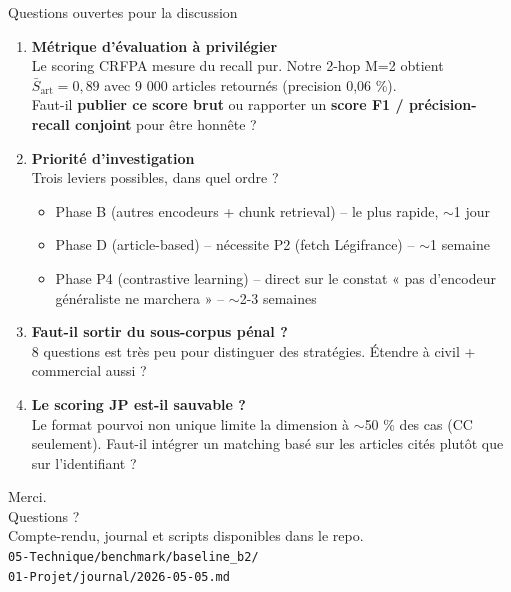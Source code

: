 \documentclass[aspectratio=169,10pt]{beamer}
\begin{document}
\begin{frame}{Questions ouvertes pour la discussion}
  \footnotesize
  \begin{enumerate}
    \item \textbf{Métrique d'évaluation à privilégier} \\
    \footnotesize Le scoring CRFPA mesure du recall pur. Notre 2-hop M=2 obtient \(\bar{S}_{\text{art}} = 0{,}89\) avec 9 000 articles retournés (precision 0,06 \%). \\
    Faut-il \textbf{publier ce score brut} ou rapporter un \textbf{score F1 / précision-recall conjoint} pour être honnête ?

    \vspace{0.4em}
    \item \textbf{Priorité d'investigation} \\
    \footnotesize Trois leviers possibles, dans quel ordre ?
    \begin{itemize}\scriptsize
      \item Phase B (autres encodeurs + chunk retrieval) -- le plus rapide, $\sim$1 jour
      \item Phase D (article-based) -- nécessite P2 (fetch Légifrance) -- $\sim$1 semaine
      \item Phase P4 (contrastive learning) -- direct sur le constat « pas d'encodeur généraliste ne marchera » -- $\sim$2-3 semaines
    \end{itemize}

    \vspace{0.4em}
    \item \textbf{Faut-il sortir du sous-corpus pénal ?} \\
    \footnotesize 8 questions est très peu pour distinguer des stratégies. Étendre à civil + commercial aussi ?

    \vspace{0.4em}
    \item \textbf{Le scoring JP est-il sauvable ?} \\
    \footnotesize Le format pourvoi non unique limite la dimension à $\sim$50 \% des cas (CC seulement). Faut-il intégrer un matching basé sur les articles cités plutôt que sur l'identifiant ?
  \end{enumerate}
\end{frame}

\begin{frame}
  \begin{center}
    \vspace{1em}
    {\Huge \textcolor{accent}{Merci.}}\\[1.5em]
    {\Large Questions ?}\\[2em]
    \footnotesize Compte-rendu, journal et scripts disponibles dans le repo. \\
    \texttt{05-Technique/benchmark/baseline\_b2/}\\
    \texttt{01-Projet/journal/2026-05-05.md}
  \end{center}
\end{frame}
\end{document}
